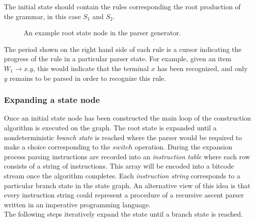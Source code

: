 \documentclass[envcountsame,runningheads]{llncs}
\begin{document}
The initial state should contain the rules corresponding the root production of the grammar, in this case $S_1$ and $S_2$.\\

\begin{figure}[!ht]
\centering
{}
\caption{An example root state node in the parser generator.}
\end{figure}

The period shown on the right hand side of each rule is a cursor indicating the progress of the rule in a particular parser state.
For example, given an item $W_1 \rightarrow x . y$, this would indicate that the terminal $x$ has been recognized, and only $y$ remains to be parsed in order to recognize this rule.\\

\subsubsection{Expanding a state node}
Once an initial state node has been constructed the main loop of the construction algorithm is executed on the graph.
The root state is expanded until a nondeterministic \emph{branch state} is reached where the parser would be required to make a choice corresponding to the $switch$ operation.
During the expansion process parsing instructions are recorded into an \emph{instruction table} where each row consists of a string of instructions.
This array will be encoded into a bitcode stream once the algorithm completes.
Each \emph{instruction string} corresponds to a particular branch state in the state graph.
An alternative view of this idea is that every instruction string could represent a procedure of a recursive ascent parser written in an imperative programming language.\\

The following steps iteratively expand the state until a branch state is reached.
\end{document}
